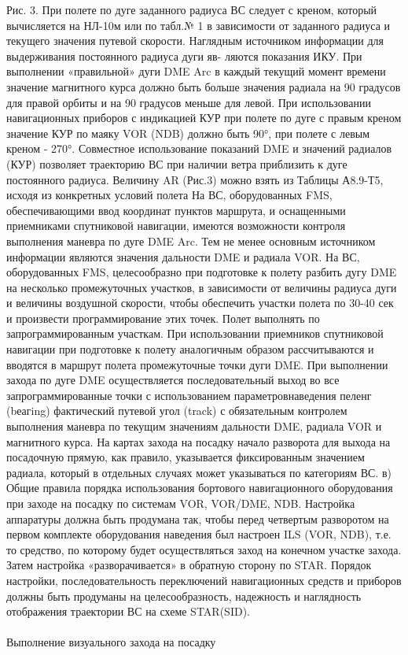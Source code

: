   
Рис. 3.	При полете по дуге заданного радиуса ВС следует с креном, который вычисляется на НЛ-10м или по табл.№ 1 в зависимости от заданного радиуса и текущего значения путевой скорости.
Наглядным источником информации для выдерживания постоянного радиуса дуги яв- ляются показания ИКУ. При выполнении «правильной» дуги DME Arc в каждый текущий момент времени значение магнитного курса должно быть больше значения радиала на 90 градусов для правой орбиты и на 90 градусов меньше для левой. 
При использовании навигационных приборов с индикацией КУР при полете по дуге с правым креном значение КУР по маяку VOR (NDB) должно быть 90°, при полете с левым креном - 270°.
Совместное использование показаний DME и значений радиалов (КУР) позволяет траекторию ВС при наличии ветра приблизить к дуге постоянного радиуса.
Величину AR (Рис.3) можно взять из Таблицы А8.9-Т5, исходя из конкретных условий полета 
На ВС, оборудованных FMS, обеспечивающими ввод координат пунктов маршрута, и оснащенными приемниками спутниковой навигации, имеются возможности контроля выполнения маневра по дуге DME Arc. Тем не менее основным источником информации являются значения дальности DME и радиала VOR.
На ВС, оборудованных FMS, целесообразно при подготовке к полету разбить дугу DME на несколько промежуточных участков, в зависимости от величины радиуса дуги и величины воздушной скорости, чтобы обеспечить участки полета по 30-40 сек и произвести программирование этих точек. Полет выполнять по запрограммированным участкам.
При использовании приемников спутниковой навигации при подготовке к полету аналогичным образом рассчитываются и вводятся в маршрут полета промежуточные точки дуги DME. При выполнении захода по дуге DME осуществляется последовательный выход во все запрограммированные точки с использованием параметровнаведения пеленг (bеагing) фактический путевой угол (track) с обязательным контролем выполнения маневра по текущим значениям дальности DME, радиала VOR и магнитного курса.
На картах захода на посадку начало разворота для выхода на посадочную прямую, как правило, указывается фиксированным значением радиала, который в отдельных случаях может указываться по категориям ВС.
в)	Общие правила порядка использования бортового навигационного оборудования при заходе на посадку по системам VOR, VOR/DME, NDB.
Настройка аппаратуры должна быть продумана так, чтобы перед четвертым разворотом на первом комплекте оборудования наведения был настроен ILS (VOR, NDB), т.е. то средство, по которому будет осуществляться заход на конечном участке захода. Затем настройка «разворачивается» в обратную сторону по STAR.
Порядок настройки, последовательность переключений навигационных средств и приборов должны быть продуманы на целесообразность, надежность и наглядность отображения траектории ВС на схеме STAR(SID).

\paragraph{} \label{sec:visual}	Выполнение визуального захода на посадку
